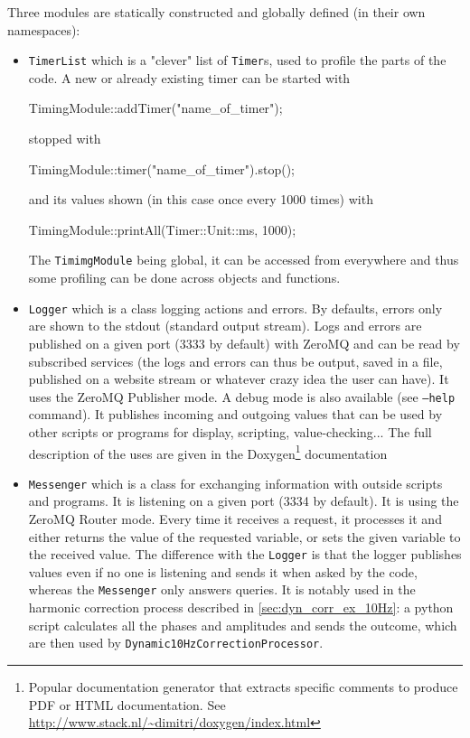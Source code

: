 Three modules are statically constructed and globally defined (in their own namespaces):
\begin{itemize}
    \item \texttt{TimerList} which is a "clever" list of \texttt{Timer}s, used to profile the parts of the code. A new or already existing timer can be started with
     \begin{c++}
         TimingModule::addTimer("name_of_timer");           
     \end{c++}
    stopped with 
    \begin{c++}
        TimingModule::timer("name_of_timer").stop();   
    \end{c++}
    and its values shown (in this case once every 1000 times) with
    \begin{c++}
        TimingModule::printAll(Timer::Unit::ms, 1000);
    \end{c++}
    The \texttt{TimimgModule} being global, it can be accessed from everywhere and thus some profiling can be done across objects and functions.

    \item \texttt{Logger} which is a class logging actions and errors. By defaults, errors only are shown to the stdout (standard output stream). Logs and errors are published on a given port (3333 by default) with ZeroMQ and can be read by subscribed services (the logs and errors can thus be output, saved in a file, published on a website stream or whatever crazy idea the user can have). It uses the ZeroMQ Publisher mode. A debug mode is also available (see \texttt{--help} command). It publishes incoming and outgoing values that can be used by other scripts or programs for display, scripting, value-checking... The full description of the uses are given in the Doxygen\footnote{Popular documentation generator that extracts specific comments to produce PDF or HTML documentation. See \url{http://www.stack.nl/~dimitri/doxygen/index.html}} documentation
    
    \item \texttt{Messenger} which is a class for exchanging information with outside scripts and programs. It is listening on a given port (3334 by default). It is using the ZeroMQ Router mode. Every time it receives a request, it processes it and either returns the value of the requested variable, or sets the given variable to the received value. The difference with the \texttt{Logger} is that the logger publishes values even if no one is listening and sends it when asked by the code, whereas the \texttt{Messenger} only answers queries. It is notably used in the harmonic correction process described in \cref{sec:dyn_corr_ex_10Hz}: a python script calculates all the phases and amplitudes and sends the outcome, which are then used by \texttt{Dynamic10HzCorrectionProcessor}.
\end{itemize}


